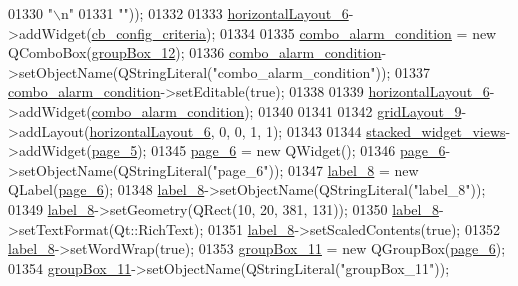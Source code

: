 \begin{DoxyCode}
01330 \textcolor{stringliteral}{"\(\backslash\)n"}
01331 \textcolor{stringliteral}{""}));
01332 
01333         \hyperlink{a00027_a1351e317cba7ca711b6b4d2212b6bf36}{horizontalLayout\_6}->addWidget(\hyperlink{a00027_a89574c631636929702a5928b2a159892}{cb\_config\_criteria});
01334 
01335         \hyperlink{a00027_a2af463e4a88fddd219f2e41a386fbd68}{combo\_alarm\_condition} = \textcolor{keyword}{new} QComboBox(\hyperlink{a00027_af55cd87dbe0f7d42980b1012f15cae2d}{groupBox\_12});
01336         \hyperlink{a00027_a2af463e4a88fddd219f2e41a386fbd68}{combo\_alarm\_condition}->setObjectName(QStringLiteral(\textcolor{stringliteral}{"combo\_alarm\_condition"}));
01337         \hyperlink{a00027_a2af463e4a88fddd219f2e41a386fbd68}{combo\_alarm\_condition}->setEditable(\textcolor{keyword}{true});
01338 
01339         \hyperlink{a00027_a1351e317cba7ca711b6b4d2212b6bf36}{horizontalLayout\_6}->addWidget(\hyperlink{a00027_a2af463e4a88fddd219f2e41a386fbd68}{combo\_alarm\_condition});
01340 
01341 
01342         \hyperlink{a00027_aa03590dd5aac614bf717649a544c015f}{gridLayout\_9}->addLayout(\hyperlink{a00027_a1351e317cba7ca711b6b4d2212b6bf36}{horizontalLayout\_6}, 0, 0, 1, 1);
01343 
01344         \hyperlink{a00027_a59e39bd3d716004e840a5be5dda18b96}{stacked\_widget\_views}->addWidget(\hyperlink{a00027_a421261d29369be60b551aabe8b097597}{page\_5});
01345         \hyperlink{a00027_a48c3dca01f963265cd2ffca998842e05}{page\_6} = \textcolor{keyword}{new} QWidget();
01346         \hyperlink{a00027_a48c3dca01f963265cd2ffca998842e05}{page\_6}->setObjectName(QStringLiteral(\textcolor{stringliteral}{"page\_6"}));
01347         \hyperlink{a00027_af183bfbfb9f38bbdd60caf92b15e23dc}{label\_8} = \textcolor{keyword}{new} QLabel(\hyperlink{a00027_a48c3dca01f963265cd2ffca998842e05}{page\_6});
01348         \hyperlink{a00027_af183bfbfb9f38bbdd60caf92b15e23dc}{label\_8}->setObjectName(QStringLiteral(\textcolor{stringliteral}{"label\_8"}));
01349         \hyperlink{a00027_af183bfbfb9f38bbdd60caf92b15e23dc}{label\_8}->setGeometry(QRect(10, 20, 381, 131));
01350         \hyperlink{a00027_af183bfbfb9f38bbdd60caf92b15e23dc}{label\_8}->setTextFormat(Qt::RichText);
01351         \hyperlink{a00027_af183bfbfb9f38bbdd60caf92b15e23dc}{label\_8}->setScaledContents(\textcolor{keyword}{true});
01352         \hyperlink{a00027_af183bfbfb9f38bbdd60caf92b15e23dc}{label\_8}->setWordWrap(\textcolor{keyword}{true});
01353         \hyperlink{a00027_a417cb0342ea95d3fe5f7e3f4feeb6515}{groupBox\_11} = \textcolor{keyword}{new} QGroupBox(\hyperlink{a00027_a48c3dca01f963265cd2ffca998842e05}{page\_6});
01354         \hyperlink{a00027_a417cb0342ea95d3fe5f7e3f4feeb6515}{groupBox\_11}->setObjectName(QStringLiteral(\textcolor{stringliteral}{"groupBox\_11"}));

\end{DoxyCode}
